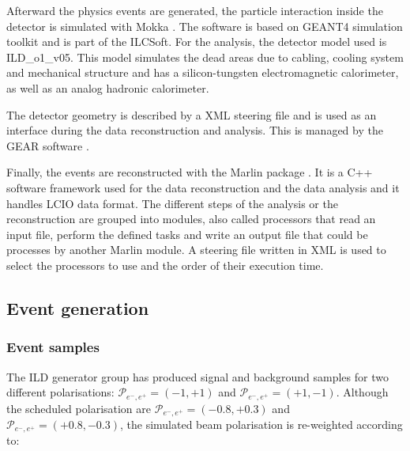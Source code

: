 
    Afterward the physics events are generated, the particle interaction inside the detector is simulated with Mokka \cite{Mokka}.
    The software is based on GEANT4 simulation toolkit \cite{GEANT4} and is part of the ILCSoft.
    For the analysis, the detector model used is ILD\_o1\_v05.
    This model simulates the dead areas due to cabling, cooling system and mechanical structure and has a silicon-tungsten electromagnetic calorimeter, as well as an analog hadronic calorimeter.
    
    The detector geometry is described by a XML steering file and is used as an interface during the data reconstruction and analysis.
    This is managed by the \gls{GEAR} software \cite{GEAR}.

    Finally, the events are reconstructed with the \gls{Marlin} package \cite{MARLIN}.
    It is a C++ software framework used for the data reconstruction and the data analysis and it handles \gls{LCIO} data format.
    The different steps of the analysis or the reconstruction are grouped into modules, also called processors that read an input file, perform the defined tasks and write an output file that could be processes by another \gls{Marlin} module.
    A steering file written in XML is used to select the processors to use and the order of their execution time.

  \subsection{Event generation}
     
     \subsubsection{Event samples}

     The \gls{ILD} generator group has produced signal and background samples for two different polarisations:  $\mathcal{P}_{e^-,e^+} = (-1,+1)$ and $\mathcal{P}_{e^-,e^+} = (+1,-1)$.
     Although the scheduled polarisation are $\mathcal{P}_{e^-,e^+} = (-0.8,+0.3)$ and  $\mathcal{P}_{e^-,e^+} = (+0.8,-0.3)$, the simulated beam polarisation is re-weighted according to:
     
